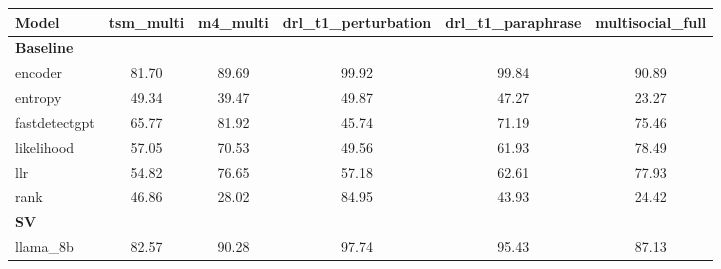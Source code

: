\begin{tabular}{lccccc}
\toprule
Model & tsm\_multi & m4\_multi & drl\_t1\_perturbation & drl\_t1\_paraphrase & multisocial\_full \\
\midrule
\multicolumn{6}{l}{\textbf{Baseline}} \\
encoder & 81.70 & 89.69 & 99.92 & 99.84 & 90.89 \\
entropy & 49.34 & 39.47 & 49.87 & 47.27 & 23.27 \\
fastdetectgpt & 65.77 & 81.92 & 45.74 & 71.19 & 75.46 \\
likelihood & 57.05 & 70.53 & 49.56 & 61.93 & 78.49 \\
llr & 54.82 & 76.65 & 57.18 & 62.61 & 77.93 \\
rank & 46.86 & 28.02 & 84.95 & 43.93 & 24.42 \\
\midrule
\multicolumn{6}{l}{\textbf{SV}} \\
llama\_8b & 82.57 & 90.28 & 97.74 & 95.43 & 87.13 \\
\bottomrule
\end{tabular}